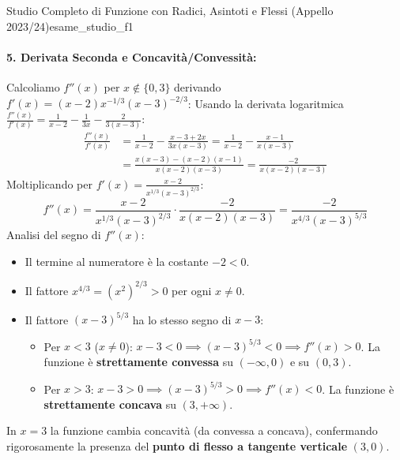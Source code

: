 \begin{esempio}{Studio Completo di Funzione con Radici, Asintoti e Flessi (Appello 2023/24)}{esame_studio_f1}
\paragraph{5. Derivata Seconda e Concavità/Convessità:}
Calcoliamo $f''(x)$ per $x \notin \{0, 3\}$ derivando $f'(x) = (x-2) x^{-1/3} (x-3)^{-2/3}$:
Usando la derivata logaritmica $\frac{f''(x)}{f'(x)} = \frac{1}{x-2} - \frac{1}{3x} - \frac{2}{3(x-3)}$:
\begin{align*}
    \frac{f''(x)}{f'(x)} &= \frac{1}{x-2} - \frac{x-3 + 2x}{3x(x-3)} = \frac{1}{x-2} - \frac{x-1}{x(x-3)} \\
    &= \frac{x(x-3) - (x-2)(x-1)}{x(x-2)(x-3)} = \frac{-2}{x(x-2)(x-3)}
\end{align*}
Moltiplicando per $f'(x) = \frac{x-2}{x^{1/3}(x-3)^{2/3}}$:
\[
    f''(x) = \frac{x-2}{x^{1/3}(x-3)^{2/3}} \cdot \frac{-2}{x(x-2)(x-3)} = \frac{-2}{x^{4/3}(x-3)^{5/3}}
\]
Analisi del segno di $f''(x)$:
\begin{itemize}
    \item Il termine al numeratore è la costante $-2 < 0$.
    \item Il fattore $x^{4/3} = (x^2)^{2/3} > 0$ per ogni $x \neq 0$.
    \item Il fattore $(x-3)^{5/3}$ ha lo stesso segno di $x-3$:
    \begin{itemize}
        \item Per $x < 3$ ($x \neq 0$): $x - 3 < 0 \implies (x-3)^{5/3} < 0 \implies f''(x) > 0$.
        La funzione è \textbf{strettamente convessa} su $(-\infty, 0)$ e su $(0, 3)$.
        \item Per $x > 3$: $x - 3 > 0 \implies (x-3)^{5/3} > 0 \implies f''(x) < 0$.
        La funzione è \textbf{strettamente concava} su $(3, +\infty)$.
    \end{itemize}
\end{itemize}
In $x = 3$ la funzione cambia concavità (da convessa a concava), confermando rigorosamente la presenza del \textbf{punto di flesso a tangente verticale} $(3, 0)$.
\end{esempio}

